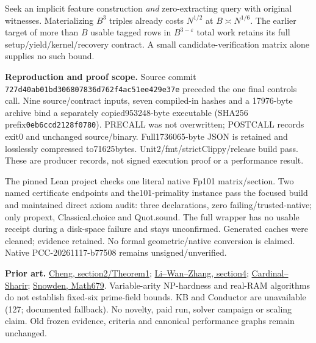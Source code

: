 \documentclass[10pt]{article}
\begin{document}
Seek an implicit feature construction \emph{and} zero-extracting query with
original witnesses. Materializing $B^3$ triples already costs $N^{1/2}$ at
$B\asymp N^{1/6}$. The earlier target of more than $B$ usable tagged rows in
$B^{3-\varepsilon}$ total work retains its full setup/yield/kernel/recovery
contract. A small candidate-verification matrix alone supplies no such bound.

\textbf{Reproduction and proof scope.} Source commit
\texttt{727d40ab01bd306807836d762f4ac51ee429e37e} preceded the one final
controls call. Nine source/contract inputs, seven compiled-in hashes and a
17976-byte archive bind a separately copied953248-byte executable (SHA256
prefix\texttt{0eb6ccd2128f0780}). PRECALL was not overwritten; POSTCALL records
exit0 and unchanged source/binary. Full1736065-byte JSON is retained and
losslessly compressed to71625bytes. Unit2/fmt/strictClippy/release build pass.
These are producer records, not signed execution proof or a performance result.

The pinned Lean project checks one literal native Fp101 matrix/section.
Two named certificate endpoints and the101-primality instance pass the
focused build and maintained direct axiom audit: three declarations, zero
failing/trusted-native; only propext, Classical.choice and Quot.sound.
The full wrapper has no usable receipt during a disk-space failure and stays
unconfirmed. Generated caches were cleaned; evidence retained. No formal
geometric/native conversion is claimed. Native PCC-20261117-b77508 remains
unsigned/unverified.

\textbf{Prior art.} \href{https://arxiv.org/pdf/cs/0507026}{Cheng, section2/Theorem1};
\href{https://arxiv.org/pdf/1501.01138}{Li--Wan--Zhang, section4};
\href{https://drops.dagstuhl.de/entities/document/10.4230/LIPIcs.SoCG.2023.22}{Cardinal--Sharir};
\href{https://websites.umich.edu/asnowden/teaching/2013/679/L02.html}{Snowden, Math679}.
Variable-arity NP-hardness and real-RAM algorithms do not establish fixed-six
prime-field bounds. KB and Conductor are unavailable (127; documented fallback).
No novelty, paid run, solver campaign or scaling claim. Old frozen evidence,
criteria and canonical performance graphs remain unchanged.
\end{document}
